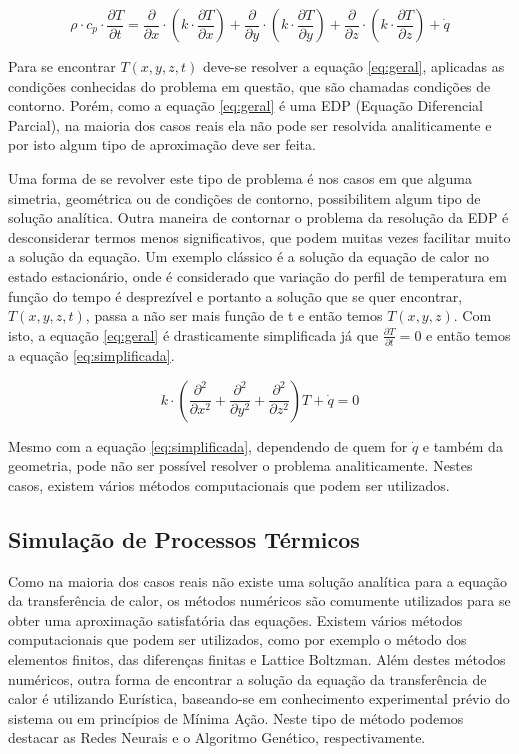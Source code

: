 \begin{equation}\label{eq:geral}
\rho \cdot c_{p} \cdot \frac{\partial T}{\partial t} = \frac{\partial}{\partial x} \cdot (k \cdot \frac{\partial T}{\partial x}) + \frac{\partial}{\partial y} \cdot (k \cdot \frac{\partial T}{\partial y}) + \frac{\partial}{\partial z} \cdot (k \cdot \frac{\partial T}{\partial z}) +  \dot{q}
\end{equation}

Para se encontrar $T(x,y,z,t)$ deve-se resolver a equação \ref{eq:geral}, aplicadas as condições conhecidas do problema em questão, que são chamadas condições de contorno. Porém, como a equação \ref{eq:geral} é uma EDP (Equação Diferencial Parcial), na maioria dos casos reais ela não pode ser resolvida analiticamente e por isto algum tipo de aproximação deve ser feita. 

Uma forma de se revolver este tipo de problema é nos casos em que alguma simetria, geométrica ou de condições de contorno, possibilitem algum tipo de solução analítica. Outra maneira de contornar o problema da resolução da EDP é desconsiderar termos menos significativos, que podem muitas vezes facilitar muito a solução da equação. Um exemplo clássico é a solução da equação de calor no estado estacionário, onde é considerado que  variação do perfil de temperatura em função do tempo é desprezível e portanto a solução que se quer encontrar, $T(x,y,z,t)$, passa a não ser mais função de t e então temos $T(x,y,z)$. Com isto, a equação \ref{eq:geral} é drasticamente simplificada já que $\frac{\partial T}{\partial t} = 0$ e então temos a equação \ref{eq:simplificada}.

\begin{equation}\label{eq:simplificada}
 k \cdot (\frac{\partial^2}{\partial x^2} + \frac{\partial^2}{\partial y^2} +  \frac{\partial^2}{\partial z^2}) T + \dot{q} = 0 
\end{equation}

Mesmo com a  equação \ref{eq:simplificada}, dependendo de quem for $\dot{q}$ e também da geometria, pode não ser possível resolver o problema analiticamente. Nestes casos, existem vários métodos computacionais que podem ser utilizados.

\subsection{Simulação de Processos Térmicos}

Como na maioria dos casos reais não existe uma solução analítica para a equação da transferência de calor, os métodos numéricos são comumente utilizados para se obter uma aproximação satisfatória das equações. Existem vários métodos computacionais que podem ser utilizados, como por exemplo o método dos elementos finitos, das diferenças finitas e Lattice Boltzman. Além destes métodos numéricos, outra forma de encontrar a solução da equação da transferência de calor é utilizando Eurística, baseando-se em conhecimento experimental prévio do sistema ou em princípios de Mínima Ação. Neste tipo de método podemos destacar  as Redes Neurais e o Algoritmo Genético, respectivamente.

